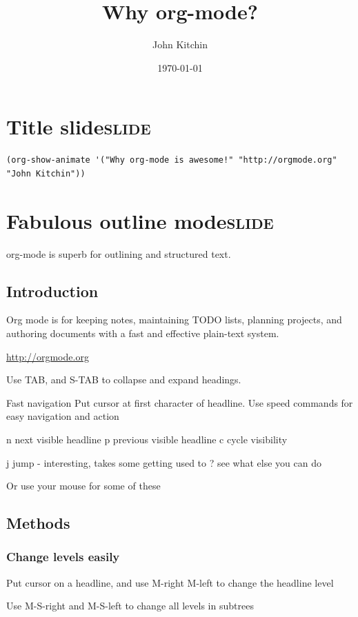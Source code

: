 \documentclass[11pt]{article}
\author{John Kitchin}
\date{\today}
\title{Why org-mode?}
\begin{document}
\tableofcontents


\section{Title slide\hfill{}\textsc{slide}}
\label{sec-1}
\begin{verbatim}
(org-show-animate '("Why org-mode is awesome!" "http://orgmode.org" "John Kitchin"))
\end{verbatim}
\section{Fabulous outline mode\hfill{}\textsc{slide}}
\label{sec-2}

org-mode is superb for outlining and structured text.

\subsection{Introduction}
\label{sec-2-1}

Org mode is for keeping notes, maintaining TODO lists, planning projects, and authoring documents with a fast and effective plain-text system.

\url{http://orgmode.org}

Use TAB, and S-TAB to collapse and expand headings.

Fast navigation
Put cursor at first character of headline. Use speed commands for easy navigation and action

n next visible headline
p previous visible headline
c cycle visibility

j jump - interesting, takes some getting used to
? see what else you can do

Or use your mouse for some of these
\subsection{Methods}
\label{sec-2-2}



\subsubsection{Change levels easily}
\label{sec-2-2-1}

Put cursor on a headline, and use M-right M-left to change the headline level

Use M-S-right and M-S-left to change all levels in subtrees
\end{document}
